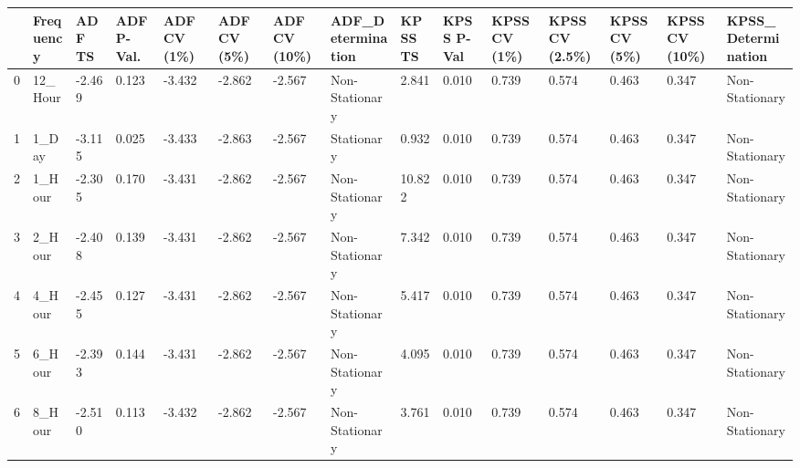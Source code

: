 \begin{tabular}{lllllllllllllll}
\toprule
 & Frequency & ADF TS & ADF P-Val. & ADF CV (1\%) & ADF CV (5\%) & ADF CV (10\%) & ADF_Determination & KPSS TS & KPSS P-Val & KPSS CV (1\%) & KPSS CV (2.5\%) & KPSS CV (5\%) & KPSS CV (10\%) & KPSS_Determination \\
\midrule
0 & 12_Hour & -2.469 & 0.123 & -3.432 & -2.862 & -2.567 & Non-Stationary & 2.841 & 0.010 & 0.739 & 0.574 & 0.463 & 0.347 & Non-Stationary \\
1 & 1_Day & -3.115 & 0.025 & -3.433 & -2.863 & -2.567 & Stationary & 0.932 & 0.010 & 0.739 & 0.574 & 0.463 & 0.347 & Non-Stationary \\
2 & 1_Hour & -2.305 & 0.170 & -3.431 & -2.862 & -2.567 & Non-Stationary & 10.822 & 0.010 & 0.739 & 0.574 & 0.463 & 0.347 & Non-Stationary \\
3 & 2_Hour & -2.408 & 0.139 & -3.431 & -2.862 & -2.567 & Non-Stationary & 7.342 & 0.010 & 0.739 & 0.574 & 0.463 & 0.347 & Non-Stationary \\
4 & 4_Hour & -2.455 & 0.127 & -3.431 & -2.862 & -2.567 & Non-Stationary & 5.417 & 0.010 & 0.739 & 0.574 & 0.463 & 0.347 & Non-Stationary \\
5 & 6_Hour & -2.393 & 0.144 & -3.431 & -2.862 & -2.567 & Non-Stationary & 4.095 & 0.010 & 0.739 & 0.574 & 0.463 & 0.347 & Non-Stationary \\
6 & 8_Hour & -2.510 & 0.113 & -3.432 & -2.862 & -2.567 & Non-Stationary & 3.761 & 0.010 & 0.739 & 0.574 & 0.463 & 0.347 & Non-Stationary \\
\bottomrule
\end{tabular}
